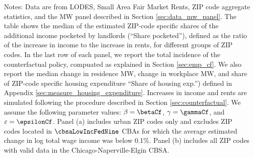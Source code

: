 \begin{table}[hbt!]
    \begin{minipage}{.95\textwidth} \footnotesize
        \vspace{4mm}
        Notes: 
        Data are from LODES, Small Area Fair Market Rents, ZIP code aggregate 
        statistics, and the MW panel described in Section \ref{sec:data_mw_panel}.
        The table shows the median of the estimated ZIP-code specific shares of 
        the additional income pocketed by landlords (``Share pocketed''), 
        defined as the ratio of the increase in income to the increase in rents,
        for different groups of ZIP codes.
        In the last row of each panel, we report the total incidence of the 
        counterfactual policy, compuated as explained in Section \ref{sec:emp_cf}.
        We also report the median change in residence MW, change in workplace MW,
        and share of ZIP-code specific housing expenditure ``Share of housing 
        exp.'') defined in Appendix \ref{sec:measure_housing_expenditure}.
        Increases in income and rents are simulated following the procedure 
        described in Section \ref{sec:counterfactual}.
        We assume the following parameter values: 
        $\beta = \betaCf$, $\gamma = \gammaCf$, and $\varepsilon = \epsilonCf$.
        Panel (a) includes urban ZIP codes only and excludes ZIP codes located 
        in $\cbsaLowIncFedNine$ CBAs for which the average estimated change in 
        log total wage income was below 0.1\%.
        Panel (b) includes all ZIP codes with valid data in the 
        Chicago-Naperville-Elgin CBSA.
    \end{minipage}
\end{table}


